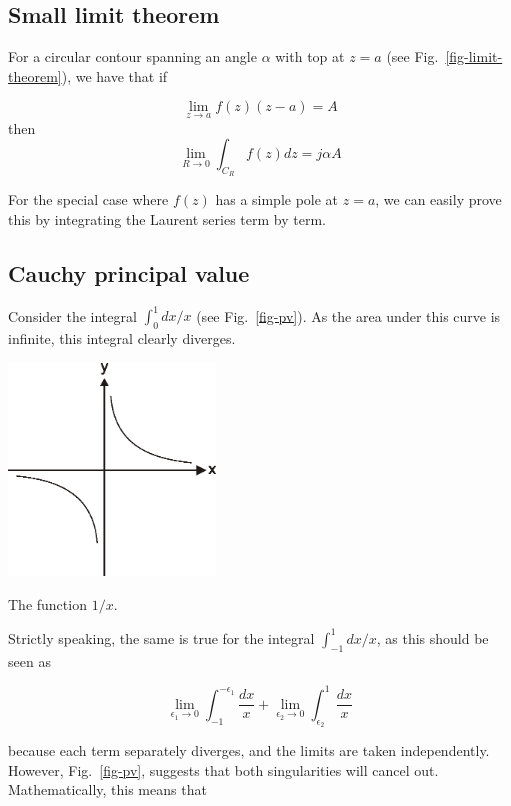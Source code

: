 \subsection*{Small limit theorem} 

For a circular contour spanning an angle $\alpha$ with top at $z=a$ (see
Fig.~\ref{fig-limit-theorem}), we have that if

\begin{equation}
\lim_{z \to a}  f(z) (z-a) = A
\end{equation}
then
\begin{equation}
\lim_{R \to 0} \int_{{C}_R} f(z) dz = j \alpha A
\end{equation}

For the special case where $f(z)$ has a simple pole at $z=a$, we can easily
prove this by integrating the Laurent series term by term.

\subsection*{Cauchy principal value}

Consider the integral $\int_0^1 dx / x$ (see Fig.~\ref{fig-pv}). As the area
under this curve is infinite, this integral clearly diverges.

\begin{marginfigure}
\centering
\includegraphics[width=5.5cm]{complex/figures/pv}
\caption{The function $1/x$.}
\label{fig-pv}
\end{marginfigure}

Strictly speaking, the same is true for the integral $\int_{-1}^1 dx / x$, as
this should be seen as

\begin{equation}
\lim_{\epsilon_1 \to 0} \int_{-1}^{-\epsilon_1} \frac{dx}{x} + \lim_{\epsilon_2
\to 0} \int_{\epsilon_2}^1 \frac{dx}{x}
\end{equation}  

because each term separately diverges, and the limits are taken independently.
However, Fig.~\ref{fig-pv}, suggests that both singularities will cancel out.
Mathematically, this means that


